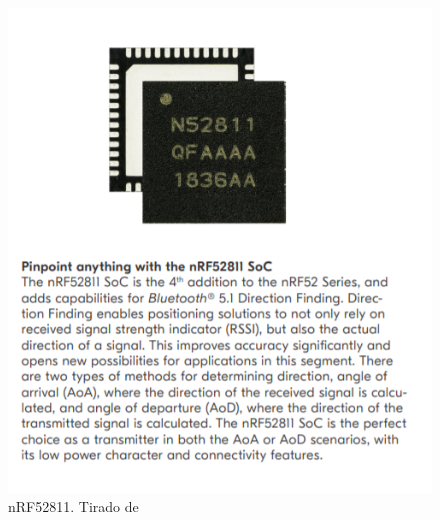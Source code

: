 \begin{figure}[H]
	\centering 
	\includegraphics[scale = 1]{images/nRF52811.png}
	\caption{nRF52811. Tirado de \cite{nRF52811_site}}
	\label{fig:nRF52811}
\end{figure}



